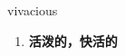
\begin{frame}
{\huge vivacious}
\begin{center}
\begin{enumerate}\Large
  \item \textbf{活泼的，快活的}
\end{enumerate}
\end{center}
\end{frame}
